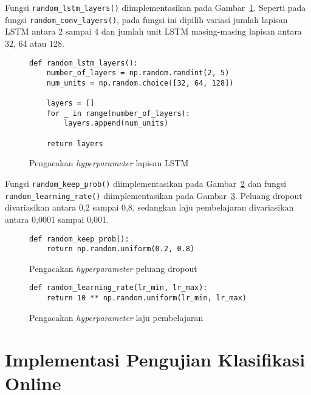 Fungsi \texttt{random_lstm_layers()} diimplementasikan pada Gambar~\ref{listing:har-random-lstm-layers}. Seperti pada fungsi \texttt{random_conv_layers()}, pada fungsi ini dipilih variasi jumlah lapisan LSTM antara 2 sampai 4 dan jumlah unit LSTM masing-masing lapisan antara 32, 64 atau 128.

\begin{figure}[h]
\begin{verbatim}
def random_lstm_layers():
    number_of_layers = np.random.randint(2, 5)
    num_units = np.random.choice([32, 64, 128])

    layers = []
    for _ in range(number_of_layers):
        layers.append(num_units)

    return layers
\end{verbatim}
\caption{Pengacakan \textit{hyperparameter} lapisan LSTM}
\label{listing:har-random-lstm-layers}
\end{figure}

Fungsi \texttt{random_keep_prob()} diimplementasikan pada Gambar~\ref{listing:har-random-keep-prob} dan fungsi \texttt{random_learning_rate()} diimplementasikan pada Gambar~\ref{listing:har-random-learning-rate}. Peluang dropout divariasikan antara 0,2 sampai 0,8, sedangkan laju pembelajaran divariasikan antara 0,0001 sampai 0,001.

\begin{figure}[h]
\begin{verbatim}
def random_keep_prob():
    return np.random.uniform(0.2, 0.8)
\end{verbatim}
\caption{Pengacakan \textit{hyperparameter} peluang dropout}
\label{listing:har-random-keep-prob}
\end{figure}

\begin{figure}[h]
\begin{verbatim}
def random_learning_rate(lr_min, lr_max):
    return 10 ** np.random.uniform(lr_min, lr_max)
\end{verbatim}
\caption{Pengacakan \textit{hyperparameter} laju pembelajaran}
\label{listing:har-random-learning-rate}
\end{figure}

\section{Implementasi Pengujian Klasifikasi Online}

